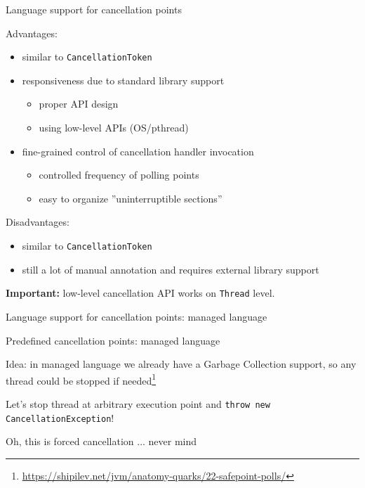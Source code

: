 \begin{frame}[fragile]{Language support for cancellation points}

Advantages:
\begin{itemize}
    \item similar to \texttt{CancellationToken}
    \item responsiveness due to standard library support 
    \begin{itemize}
        \item proper API design
        \item using low-level APIs (OS/pthread)
    \end{itemize}
    \item fine-grained control of cancellation handler invocation 
    \begin{itemize}
        \item controlled frequency of polling points
        \item easy to organize ''uninterruptible sections''
    \end{itemize}
\end{itemize}

Disadvantages:
\begin{itemize}
    \item similar to \texttt{CancellationToken}
    \item still a lot of manual annotation and requires external library support
\end{itemize}

\textbf{Important:} low-level cancellation API works on \texttt{Thread} level.

\end{frame}




\begin{frame}{Language support for cancellation points: managed language}
\end{frame}


\begin{frame}[t]{Predefined cancellation points: managed language}

Idea: in managed language we already have a Garbage Collection support, so any thread could be stopped if needed\footnote{\tiny\url{https://shipilev.net/jvm/anatomy-quarks/22-safepoint-polls/}}

Let's stop thread at arbitrary execution point and \texttt{throw new CancellationException}!

\pause

Oh, this is forced cancellation ... never mind
\end{frame}

